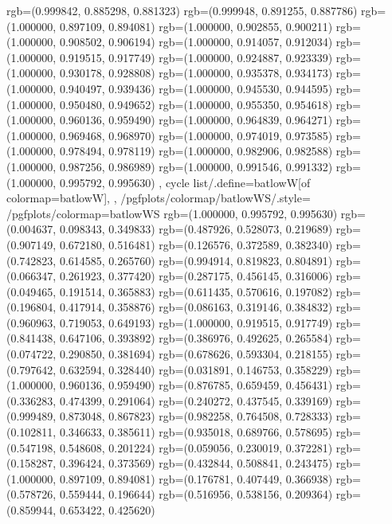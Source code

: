{{{					rgb=(0.999842, 0.885298, 0.881323)
					rgb=(0.999948, 0.891255, 0.887786)
					rgb=(1.000000, 0.897109, 0.894081)
					rgb=(1.000000, 0.902855, 0.900211)
					rgb=(1.000000, 0.908502, 0.906194)
					rgb=(1.000000, 0.914057, 0.912034)
					rgb=(1.000000, 0.919515, 0.917749)
					rgb=(1.000000, 0.924887, 0.923339)
					rgb=(1.000000, 0.930178, 0.928808)
					rgb=(1.000000, 0.935378, 0.934173)
					rgb=(1.000000, 0.940497, 0.939436)
					rgb=(1.000000, 0.945530, 0.944595)
					rgb=(1.000000, 0.950480, 0.949652)
					rgb=(1.000000, 0.955350, 0.954618)
					rgb=(1.000000, 0.960136, 0.959490)
					rgb=(1.000000, 0.964839, 0.964271)
					rgb=(1.000000, 0.969468, 0.968970)
					rgb=(1.000000, 0.974019, 0.973585)
					rgb=(1.000000, 0.978494, 0.978119)
					rgb=(1.000000, 0.982906, 0.982588)
					rgb=(1.000000, 0.987256, 0.986989)
					rgb=(1.000000, 0.991546, 0.991332)
					rgb=(1.000000, 0.995792, 0.995630)
			},
		cycle list/.define={batlowW}{[of colormap=batlowW]},
		},
		/pgfplots/colormap/batlowWS/.style={
			/pgfplots/colormap={batlowWS}{%
					rgb=(1.000000, 0.995792, 0.995630)
					rgb=(0.004637, 0.098343, 0.349833)
					rgb=(0.487926, 0.528073, 0.219689)
					rgb=(0.907149, 0.672180, 0.516481)
					rgb=(0.126576, 0.372589, 0.382340)
					rgb=(0.742823, 0.614585, 0.265760)
					rgb=(0.994914, 0.819823, 0.804891)
					rgb=(0.066347, 0.261923, 0.377420)
					rgb=(0.287175, 0.456145, 0.316006)
					rgb=(0.049465, 0.191514, 0.365883)
					rgb=(0.611435, 0.570616, 0.197082)
					rgb=(0.196804, 0.417914, 0.358876)
					rgb=(0.086163, 0.319146, 0.384832)
					rgb=(0.960963, 0.719053, 0.649193)
					rgb=(1.000000, 0.919515, 0.917749)
					rgb=(0.841438, 0.647106, 0.393892)
					rgb=(0.386976, 0.492625, 0.265584)
					rgb=(0.074722, 0.290850, 0.381694)
					rgb=(0.678626, 0.593304, 0.218155)
					rgb=(0.797642, 0.632594, 0.328440)
					rgb=(0.031891, 0.146753, 0.358229)
					rgb=(1.000000, 0.960136, 0.959490)
					rgb=(0.876785, 0.659459, 0.456431)
					rgb=(0.336283, 0.474399, 0.291064)
					rgb=(0.240272, 0.437545, 0.339169)
					rgb=(0.999489, 0.873048, 0.867823)
					rgb=(0.982258, 0.764508, 0.728333)
					rgb=(0.102811, 0.346633, 0.385611)
					rgb=(0.935018, 0.689766, 0.578695)
					rgb=(0.547198, 0.548608, 0.201224)
					rgb=(0.059056, 0.230019, 0.372281)
					rgb=(0.158287, 0.396424, 0.373569)
					rgb=(0.432844, 0.508841, 0.243475)
					rgb=(1.000000, 0.897109, 0.894081)
					rgb=(0.176781, 0.407449, 0.366938)
					rgb=(0.578726, 0.559444, 0.196644)
					rgb=(0.516956, 0.538156, 0.209364)
					rgb=(0.859944, 0.653422, 0.425620)
}}}
